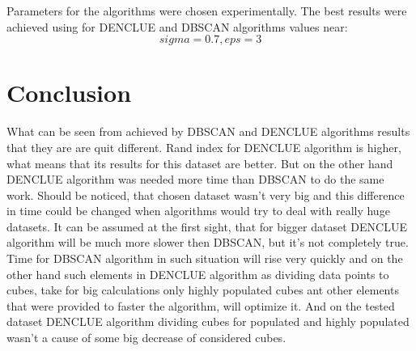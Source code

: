 \documentclass[12pt, a4paper, notitlepage, oneside]{article}
\begin{document}
Parameters for the algorithms were chosen experimentally. The best results were achieved using for DENCLUE and DBSCAN algorithms values near: 
$$sigma = 0.7, eps = 3$$



\cleardoublepage


\section*{Conclusion}

What can be seen from achieved by DBSCAN and DENCLUE algorithms results that they are are quit different. Rand index for DENCLUE algorithm is higher, what means that its results for this dataset are better. But on the other hand DENCLUE  algorithm was needed  more time than DBSCAN to do the same work.  Should be noticed, that chosen dataset wasn't very big and this difference in time could be changed when algorithms would try to deal with really huge datasets. It can be assumed at the first sight, that for bigger dataset DENCLUE algorithm will be much more slower then DBSCAN, but it's not completely true. Time for DBSCAN algorithm in such situation will rise very quickly and on the other hand such elements in DENCLUE algorithm as dividing data points to cubes, take for big calculations only highly populated cubes ant other elements that were provided to faster the algorithm, will optimize it. And on the tested dataset DENCLUE algorithm dividing cubes for populated and highly populated wasn't a cause of some big decrease of considered cubes. 




\newpage



\end{document}
